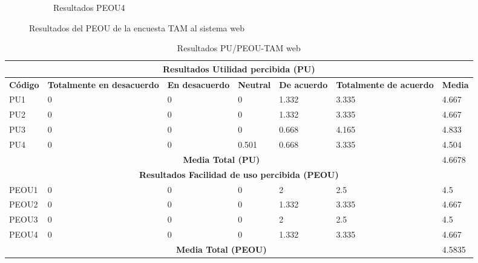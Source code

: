 \begin{figure}[H]
\begin{subfigure}[b]{0.4\textwidth}
        \caption{Resultados PEOU4}
    \end{subfigure}%
    \caption{Resultados del PEOU de la encuesta TAM al sistema web}
    \label{fig:TAM-w-PEOU-Result}
\end{figure}

\begin{footnotesize}
\begin{spacing}{1}
    \begin{center}
        \renewcommand*{\arraystretch}{1.4}
    \begin{longtable}{|p{}|p{}|p{}|p{}|p{}|p{}|p{}|}
        \caption{Resultados PU/PEOU-TAM web}\\
        \hline
        \multicolumn{7}{|c|}{\textbf{Resultados Utilidad percibida (PU)}}\\
        \hline
        \textbf{Código} & \textbf{Totalmente en desacuerdo} & \textbf{En desacuerdo} & \textbf{Neutral} & \textbf{De acuerdo} & \textbf{Totalmente de acuerdo} & \textbf{Media} \\
        \hline
        PU1 & 0 & 0 & 0 & 1.332 & 3.335 & 4.667\\
        \hline
        PU2 & 0 & 0 & 0 & 1.332 & 3.335 & 4.667\\
        \hline
        PU3 & 0 & 0 & 0 & 0.668 & 4.165 & 4.833\\
        \hline
        PU4 & 0 & 0 & 0.501 & 0.668 & 3.335 & 4.504\\
        \hline
            \multicolumn{6}{|c|}{\textbf{Media Total (PU)}} & 4.6678\\
        \hline
            \multicolumn{7}{|c|}{\textbf{Resultados Facilidad de uso percibida (PEOU)}}\\
        \hline
        PEOU1 & 0 & 0 & 0 & 2 & 2.5 & 4.5\\
        \hline
        PEOU2 & 0 & 0 & 0 & 1.332 & 3.335 & 4.667\\
        \hline
        PEOU3 & 0 & 0 & 0 & 2 & 2.5 & 4.5\\
        \hline
        PEOU4 & 0 & 0 & 0 & 1.332 & 3.335 & 4.667\\
        \hline
            \multicolumn{6}{|c|}{\textbf{Media Total (PEOU)}} & 4.5835\\
        \hline
    \end{longtable}
\end{center}
\end{spacing}
\end{footnotesize}



